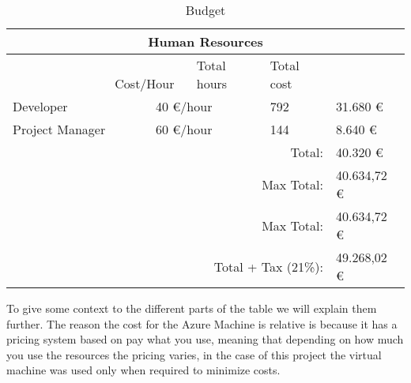 \begin{table}[h!]
{\begin{tabular}{|l|l|l|l|l|l|l|}
		\hline
		\multicolumn{7}{|c|}{{\cellcolor[rgb]{0.502,1,1}}Human Resources}                                                                                                                       \\ 
		\hline
		\rowcolor[rgb]{0.753,0.753,0.753} \multicolumn{2}{|l|}{Category}                              & \multicolumn{2}{l|}{~ Cost/Hour} & Total hours       & \multicolumn{2}{l|}{Total cost}  \\ 
		\hline
		\multicolumn{2}{|l|}{Developer}                                                               & \multicolumn{2}{l|}{40 \euro/hour}   & 792               & \multicolumn{2}{l|}{31.680 \euro}     \\ 
		\hline
		\multicolumn{2}{|l|}{Project Manager}                                                         & \multicolumn{2}{l|}{60 \euro/hour}   & 144               & \multicolumn{2}{l|}{8.640 \euro}      \\ 
		\hline
		\multicolumn{5}{|r|}{{\cellcolor[rgb]{0,0.682,0.937}}Total:}                                                                                          & \multicolumn{2}{l|}{40.320 \euro}     \\
		\hline
		\multicolumn{5}{|r|}{{\cellcolor[rgb]{0.749,0.749,0.749}}Max Total:}                                                                                 & \multicolumn{2}{l|}{40.634,72 \euro}  \\
		\hline
		\multicolumn{5}{|r|}{{\cellcolor[rgb]{0.749,0.749,0.749}}Max Total:}                                                                                 & \multicolumn{2}{l|}{40.634,72 \euro}  \\ 
		\hline\hline
		\multicolumn{5}{||r|}{{\cellcolor{yellow}}Total + Tax (21\%):}                                                                                       & \multicolumn{2}{l|}{49.268,02 \euro}  \\
		\hline\hline
	\end{tabular}}
	\label{costs}
	\caption{Budget}
\end{table}

To give some context to the different parts of the table we will explain them further. The reason the cost for the Azure Machine is relative is because it has a pricing system based on pay what you use, meaning that depending on how much you use the resources the pricing varies, in the case of this project the virtual machine was used only when required to minimize costs.